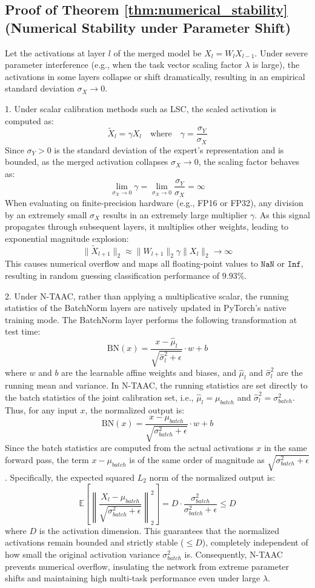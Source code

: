 \documentclass{article}
\theoremstyle{plain}
\theoremstyle{definition}
\theoremstyle{remark}
\begin{document}
\subsection{Proof of Theorem \ref{thm:numerical_stability} (Numerical Stability under Parameter Shift)}
Let the activations at layer $l$ of the merged model be $X_l = W_l X_{l-1}$. Under severe parameter interference (e.g., when the task vector scaling factor $\lambda$ is large), the activations in some layers collapse or shift dramatically, resulting in an empirical standard deviation $\sigma_X \to 0$.

1. Under scalar calibration methods such as LSC, the scaled activation is computed as:
$$\widetilde{X}_l = \gamma X_l \quad \text{where} \quad \gamma = \frac{\sigma_Y}{\sigma_X}$$
Since $\sigma_Y > 0$ is the standard deviation of the expert's representation and is bounded, as the merged activation collapses $\sigma_X \to 0$, the scaling factor behaves as:
$$\lim_{\sigma_X \to 0} \gamma = \lim_{\sigma_X \to 0} \frac{\sigma_Y}{\sigma_X} = \infty$$
When evaluating on finite-precision hardware (e.g., FP16 or FP32), any division by an extremely small $\sigma_X$ results in an extremely large multiplier $\gamma$. As this signal propagates through subsequent layers, it multiplies other weights, leading to exponential magnitude explosion:
$$\|\widetilde{X}_{l+1}\|_2 \approx \|W_{l+1}\|_2 \gamma \|X_l\|_2 \to \infty$$
This causes numerical overflow and maps all floating-point values to $\texttt{NaN}$ or $\texttt{Inf}$, resulting in random guessing classification performance of $9.93\%$.

2. Under N-TAAC, rather than applying a multiplicative scalar, the running statistics of the BatchNorm layers are natively updated in PyTorch's native training mode. The BatchNorm layer performs the following transformation at test time:
$$\text{BN}(x) = \frac{x - \hat{\mu}_l}{\sqrt{\hat{\sigma}_l^2 + \epsilon}} \cdot w + b$$
where $w$ and $b$ are the learnable affine weights and biases, and $\hat{\mu}_l$ and $\hat{\sigma}_l^2$ are the running mean and variance. In N-TAAC, the running statistics are set directly to the batch statistics of the joint calibration set, i.e., $\hat{\mu}_l = \mu_{batch}$ and $\hat{\sigma}_l^2 = \sigma_{batch}^2$.
Thus, for any input $x$, the normalized output is:
$$\text{BN}(x) = \frac{x - \mu_{batch}}{\sqrt{\sigma_{batch}^2 + \epsilon}} \cdot w + b$$
Since the batch statistics are computed from the actual activations $x$ in the same forward pass, the term $x - \mu_{batch}$ is of the same order of magnitude as $\sqrt{\sigma_{batch}^2 + \epsilon}$.
Specifically, the expected squared $L_2$ norm of the normalized output is:
$$\mathbb{E}\left[ \left\| \frac{X_l - \mu_{batch}}{\sqrt{\sigma_{batch}^2 + \epsilon}} \right\|_2^2 \right] = D \cdot \frac{\sigma_{batch}^2}{\sigma_{batch}^2 + \epsilon} \le D$$
where $D$ is the activation dimension.
This guarantees that the normalized activations remain bounded and strictly stable ($\le D$), completely independent of how small the original activation variance $\sigma_{batch}^2$ is. Consequently, N-TAAC prevents numerical overflow, insulating the network from extreme parameter shifts and maintaining high multi-task performance even under large $\lambda$.
\end{document}
